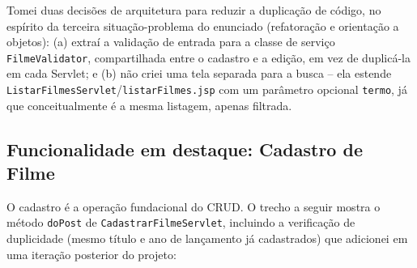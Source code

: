 \documentclass[12pt,a4paper]{article}
\begin{document}
Tomei duas decisões de arquitetura para reduzir a duplicação de código, no espírito da terceira
situação-problema do enunciado (refatoração e orientação a objetos): (a) extraí a validação de
entrada para a classe de serviço \texttt{FilmeValidator}, compartilhada entre o cadastro e a
edição, em vez de duplicá-la em cada Servlet; e (b) não criei uma tela separada para a busca --
ela estende \texttt{ListarFilmesServlet}/\texttt{listarFilmes.jsp} com um parâmetro opcional
\texttt{termo}, já que conceitualmente é a mesma listagem, apenas filtrada.

\subsection{Funcionalidade em destaque: Cadastro de Filme}

O cadastro é a operação fundacional do CRUD. O trecho a seguir mostra o método
\texttt{doPost} de \texttt{CadastrarFilmeServlet}, incluindo a verificação de duplicidade
(mesmo título e ano de lançamento já cadastrados) que adicionei em uma iteração posterior do
projeto:
\end{document}
